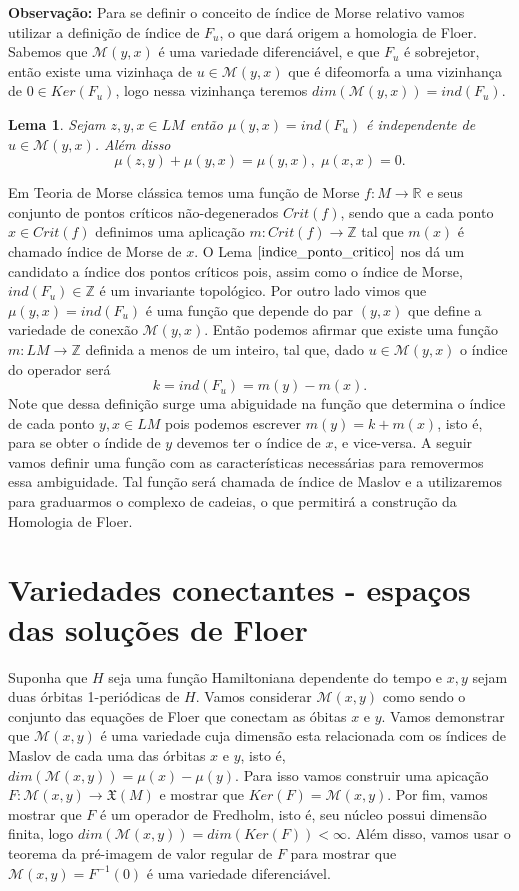 \documentclass[12pt]{book}
\newtheorem{lema}[teorema]{Lema}
\newcommand{\campossuaves}[1]{\mathfrak{X}(#1)}
\newcommand{\espacomoduli}[2]{\mathcal{M}(#1, #2)}
\newcommand{\real}[1]{\mathbb{R}^{#1}}
\begin{document}
	\textbf{Observação:} Para se definir o conceito de índice de Morse relativo vamos utilizar a definição de índice de $F_{u}$, o que dará origem a homologia de Floer. Sabemos que $\mathcal{M}(y,x)$ é uma variedade diferenciável, e que $F_{u}$ é sobrejetor, então existe uma vizinhaça de $u \in \mathcal{M}(y,x)$ que é difeomorfa a uma vizinhança de $0 \in Ker(F_{u})$, logo nessa vizinhança teremos $dim(\mathcal{M}(y,x)) = ind(F_{u})$.
	
	\begin{lema}\label{indice_ponto_critico} Sejam $z,y,x \in LM$ então $\mu(y,x) = ind(F_{u})$ é independente de $u \in \mathcal{M}(y,x)$. Além disso
		$$
		\mu(z,y) + \mu(y,x) = \mu(y,x), \; \mu(x,x) = 0.   
		$$
	\end{lema}
	Em Teoria de Morse clássica temos uma função de Morse $f:M\to \real{}$ e seus conjunto de pontos críticos não-degenerados $Crit(f)$, sendo que a cada ponto $x \in Crit(f)$ definimos uma aplicação $m:Crit(f) \to \mathbb{Z}$ tal que $m(x)$ é chamado índice de Morse de $x$.	O Lema $\ref{indice_ponto_critico}$ nos dá um candidato a índice dos pontos críticos pois, assim como o índice de Morse, $ind(F_{u}) \in \mathbb{Z}$ é um invariante topológico. Por outro lado vimos que $\mu(y,x) = ind(F_{u})$ é uma função que depende do par $(y, x)$ que define a variedade de conexão $\mathcal{M}(y, x)$. Então podemos afirmar que existe uma função $m : LM \to \mathbb{Z}$ definida a menos de um inteiro, tal que, dado $u \in \mathcal{M}(y,x)$ o índice do operador será 
	$$
	k = ind(F_{u}) = m(y)-m(x).
	$$
	Note que dessa definição surge uma abiguidade na função que determina o índice de cada ponto $y,x \in LM$ pois podemos escrever $m(y) = k+m(x)$, isto é, para se obter o índide de $y$ devemos ter o índice de $x$, e vice-versa. A seguir vamos definir uma função com as características necessárias para removermos essa ambiguidade. Tal função será chamada de índice de Maslov e a utilizaremos para graduarmos o complexo de cadeias, o que permitirá a construção da Homologia de Floer. 
	
	\section{Variedades conectantes - espaços das soluções de Floer}
	Suponha que $H$ seja uma função Hamiltoniana dependente do tempo e $x, y$ sejam duas órbitas 1-periódicas de $H$. Vamos considerar $\espacomoduli{x}{y}$ como sendo o conjunto das equações de Floer que conectam as óbitas $x$ e $y$. Vamos demonstrar que $\espacomoduli{x}{y}$ é uma variedade cuja dimensão esta relacionada com os índices de Maslov de cada uma das órbitas $x$ e $y$, isto é, $dim(\espacomoduli{x}{y}) = \mu(x)-\mu(y)$. Para  isso vamos construir uma apicação $F: \espacomoduli{x}{y} \to \campossuaves{M}$ e mostrar que $Ker(F) = \espacomoduli{x}{y}$. Por fim, vamos mostrar que $F$ é um operador de Fredholm, isto é, seu núcleo possui dimensão finita, logo $dim (\espacomoduli{x}{y}) = dim (Ker(F)) < \infty$. Além disso, vamos usar o teorema da pré-imagem de valor regular de $F$ para mostrar que $\espacomoduli{x}{y} = F^{-1}(0)$ é uma variedade diferenciável.
\end{document}

